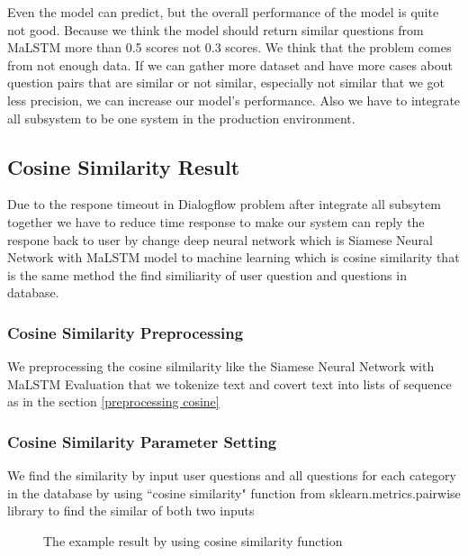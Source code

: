 \documentclass[12pt,oneside,openright,a4paper]{cpe-english-project}
\begin{document}
Even the model can predict, but the overall performance of the model is quite not good. Because we think the model should return similar questions from MaLSTM more than 0.5 scores not 0.3 scores. We think that the problem comes from not enough data. If we can gather more dataset and have more cases about question pairs that are similar or not similar, especially not similar that we got less precision, we can increase our model's performance. Also we have to integrate all subsystem to be one system in the production environment.

\subsection{Cosine Similarity Result}
\label{ch4_cosine_similarity_result}
Due to the respone timeout in Dialogflow problem after integrate all subsytem together we have to reduce time response to make our system can reply the respone back to user by change deep neural network which is Siamese Neural Network with MaLSTM model to machine learning which is cosine similarity that is the same method the find similiarity of user question and questions in database.
\subsubsection{Cosine Similarity Preprocessing}
We preprocessing the cosine silmilarity like the Siamese Neural Network with MaLSTM Evaluation that we tokenize
text and covert text into lists of sequence as in the section \ref*{preprocessing cosine}~
\subsubsection{Cosine Similarity Parameter Setting}
We find the similarity by input user questions and all questions for each category in the database by using ``cosine similarity" function from sklearn.metrics.pairwise library to find the similar of both two inputs
\begin{figure}[!h]\centering
{}
\caption{The example result by using cosine similarity function}\label{fig:cosine_result}
\end{figure}
\pagebreak
\end{document}
